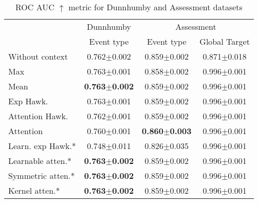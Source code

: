 \begin{table}[!t]
\caption{ROC AUC $\uparrow$ metric for Dunnhumby and Assessment datasets}
\label{tab:dunnhumby}
\centering
\begin{tabular}{l|c|cc}
\hline

& Dunnhumby & \multicolumn{2}{c}{Assessment } \\ 
& Event type & Event type & Global Target\\ 
\hline
Without context&0.762$\pm$0.002&0.859$\pm$0.002&0.871$\pm$0.018\\
Max&0.763$\pm$0.001&0.858$\pm$0.002&0.996$\pm$0.001\\
Mean&\textbf{0.763$\pm$0.002}&0.859$\pm$0.002&0.996$\pm$0.001\\
Exp Hawk.&0.763$\pm$0.001&0.859$\pm$0.002&0.996$\pm$0.001\\
Attention Hawk.&0.762$\pm$0.001&0.859$\pm$0.002&0.996$\pm$0.001\\
Attention&0.760$\pm$0.001&\textbf{0.860$\pm$0.003}&0.996$\pm$0.001\\
Learn. exp Hawk.*&0.748$\pm$0.011&0.826$\pm$0.035&0.996$\pm$0.001\\
Learnable atten.*&\textbf{0.763$\pm$0.002}&0.859$\pm$0.002&0.996$\pm$0.001\\
Symmetric atten.*&\textbf{0.763$\pm$0.002}&0.859$\pm$0.002&0.996$\pm$0.001\\
Kernel atten.*&\textbf{0.763$\pm$0.002}&0.859$\pm$0.002&0.996$\pm$0.001\\
\hline
\end{tabular}
\end{table}